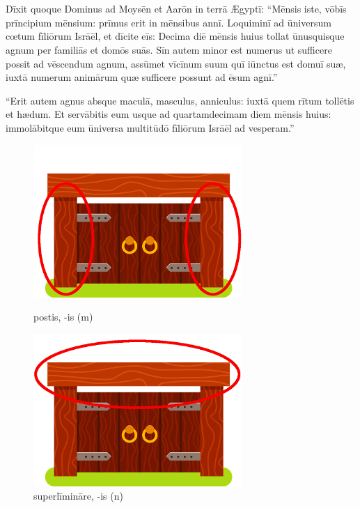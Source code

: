 \chapter{}


\thispagestyle{empty}

Dīxit quoque Dominus ad Moysēn et Aarōn in terrā
Ægyptī: ``Mēnsis iste, vōbīs prīncipium mēnsium: prīmus erit in mēnsibus
annī. Loquiminī ad ūniversum cœtum fīliōrum Isrāēl, et
dīcite eīs: Decima diē mēnsis huius tollat ūnusquisque agnum per familiās
et domōs suās. Sīn autem minor est numerus ut sufficere
possit ad vēscendum agnum, assūmet vīcīnum suum quī iūnctus est domuī suæ, iuxtā numerum
animārum quæ sufficere possunt ad ēsum agnī.''

``Erit autem agnus absque
maculā,
masculus, anniculus:
iuxtā quem rītum
tollētis et hædum. Et
servābitis eum usque ad quartamdecimam diem mēnsis huius:
immolābitque eum ūniversa multitūdō
fīliōrum Isrāēl ad vesperam.''

\begin{figure}[h!]
    \begin{minipage}[hp]{0.5\linewidth}
        \centering
        \includegraphics{postis}
        \caption{postis, -is (m)}
    \end{minipage}%
    \begin{minipage}[hp]{0.5\linewidth}
        \centering
        \includegraphics{superlimen}
        \caption{superlīmināre, -is (n)}
    \end{minipage}
\end{figure}

